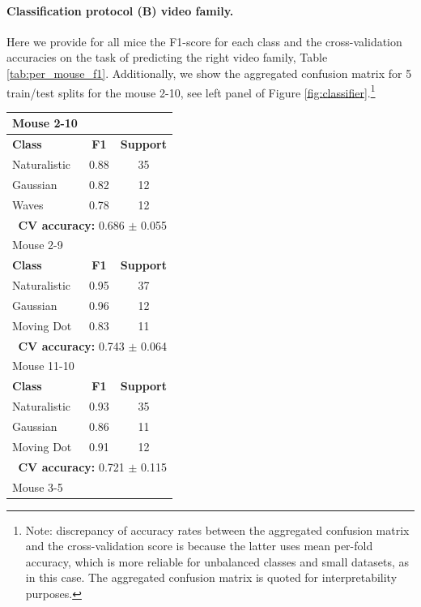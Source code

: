 \documentclass[11pt]{article}
\begin{document}
\paragraph{Classification protocol (B) video family.} Here we provide for all mice the F1-score for each class and the cross-validation accuracies on the task of predicting the right video family, Table \ref{tab:per_mouse_f1}. Additionally, we show the aggregated confusion matrix for 5 train/test splits for the mouse \textsc{2-10}, see left panel of Figure \ref{fig:classifier}.\footnote{Note: discrepancy of accuracy rates between the aggregated confusion matrix and the cross-validation score is because the latter uses mean per-fold accuracy, which is more reliable for unbalanced classes and small datasets, as in this case. The aggregated confusion matrix is quoted for interpretability purposes.}
\begin{table}[h]
\centering
\small
\begin{tabular}{l c c}
\toprule
Mouse \textsc{2-10} & & \\
\midrule
 \textbf{Class} & \textbf{F1} & \textbf{Support} \\
\midrule
Naturalistic & 0.88 & 35 \\
Gaussian    & 0.82 & 12 \\
Waves    & 0.78 & 12 \\
\cmidrule(lr){1-3}
\multicolumn{3}{r}{\textbf{CV accuracy:} 0.686 $\pm$ 0.055} \\
\bottomrule
\toprule
Mouse \textsc{2-9} & & \\
\midrule
 \textbf{Class} & \textbf{F1} & \textbf{Support} \\
\midrule
Naturalistic & 0.95 & 37 \\
Gaussian    & 0.96 & 12 \\
Moving Dot    & 0.83 & 11 \\
\cmidrule(lr){1-3}
\multicolumn{3}{r}{\textbf{CV accuracy:} 0.743 $\pm$ 0.064} \\
\bottomrule
\toprule
Mouse \textsc{11-10} & & \\
\midrule
 \textbf{Class} & \textbf{F1} & \textbf{Support} \\
\midrule
Naturalistic & 0.93 & 35 \\
Gaussian    & 0.86 & 11 \\
Moving Dot    & 0.91 & 12 \\
\cmidrule(lr){1-3}
\multicolumn{3}{r}{\textbf{CV accuracy:} 0.721 $\pm$ 0.115} \\
\bottomrule
\toprule
Mouse \textsc{3-5} & & \\

\end{tabular}
\end{table}
\end{document}
